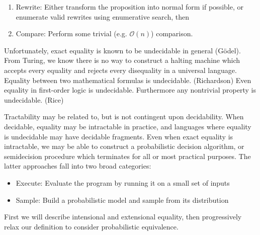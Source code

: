 \documentclass[11pt]{article}
\begin{document}
    \begin{enumerate}
        \item Rewrite: Either transform the proposition into normal form if possible, or enumerate valid rewrites using enumerative search, then
        \item Compare: Perform some trivial (e.g. $\mathcal{O}(n)$) comparison.
    \end{enumerate}

    Unfortunately, exact equality is known to be undecidable in general (G\"odel). From Turing, we know there is no way to construct a halting machine which accepts every equality and rejects every disequality in a universal language. Equality between two mathematical formulas is undecidable. (Richardson) Even equality in first-order logic is undecidable. Furthermore any nontrivial property is undecidable. (Rice)


    Tractability may be related to, but is not contingent upon decidability. When decidable, equality may be intractable in practice, and languages where equality is undecidable may have decidable fragments. Even when exact equality is intractable, we may be able to construct a probabilistic decision algorithm, or semidecision procedure which terminates for all or most practical purposes. The latter approaches fall into two broad categories:

    \begin{itemize}
        \item Execute: Evaluate the program by running it on a small set of inputs
        \item Sample: Build a probabilistic model and sample from its distribution
    \end{itemize}

    First we will describe intensional and extensional equality, then progressively relax our definition to consider probabilistic equivalence.


%
\end{document}
